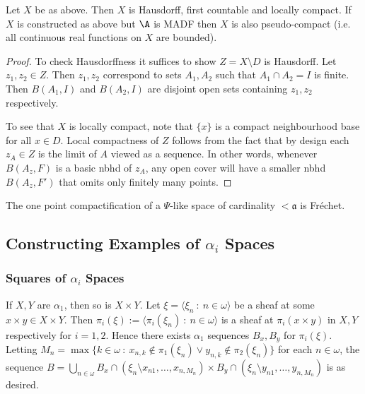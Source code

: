 \documentclass{article}
\begin{document}
\begin{prop}
    Let \(X\) be as above. Then \(X\) is Hausdorff, first countable and locally compact. If \(X\) is constructed as above but \(\A\) is MADF then \(X\) is also pseudo-compact (i.e. all continuous real functions on \(X\) are bounded).
\end{prop}

\begin{proof}
    To check Hausdorffness it suffices to show \(Z = X\setminus D\) is Hausdorff. Let \(z_1, z_2 \in Z\). Then \(z_1, z_2\) correspond to sets \(A_1, A_2\) such that \(A_1 \cap A_2 = I\) is finite. Then \(B(A_1, I)\) and \(B(A_2, I)\) are disjoint open sets containing \(z_1, z_2\) respectively. 

    To see that \(X\) is locally compact, note that \(\{x\}\) is a compact neighbourhood base for all \(x \in D\). Local compactness of \(Z\) follows from the fact that by design each \(z_A \in Z\) is the limit of \(A\) viewed as a sequence. In other words, whenever \(B(A_z, F)\) is a basic nbhd of \(z_A\), any open cover will have a smaller nbhd \(B(A_z, F')\) that omits only finitely many points.
\end{proof}

\begin{prop}
    The one point compactification of a \(\Psi\)-like space of cardinality \(<\mathfrak{a}\) is Fréchet. 
\end{prop}

\subsection{Constructing Examples of \(\alpha_i\) Spaces}
\subsubsection{Squares of \(\alpha_i\) Spaces} 
\begin{exam}
    If \(X, Y\) are \(\alpha_1\), then so is \(X \times Y\). Let \(\xi = \langle \xi_n \: : \: n \in \omega \rangle \) be a  sheaf at some \(x\times y \in X \times Y\). Then \(\pi_i(\xi) := \langle \pi_i(\xi_n) \: : \: n \in \omega\rangle\) is a sheaf at \(\pi_i(x\times y)\) in \(X, Y\) respectively for \(i = 1, 2\). Hence there exists \(\alpha_1\) sequences \(B_x, B_y\) for \(\pi_i(\xi)\). Letting \(M_n = \max\{k \in \omega \: : \: x_{n,k} \not \in \pi_1(\xi_n) \vee y_{n,k} \not \in \pi_2(\xi_n)\} \) for each \(n \in \omega\), the sequence \(B = \bigcup_{n \in \omega}B_x \cap (\xi_n\setminus {x_{n1}, \dots, x_{n, M_n}}) \times B_y \cap (\xi_n\setminus {y_{n1}, \dots, y_{n, M_n}})\) is as desired.
\end{exam}
\end{document}
